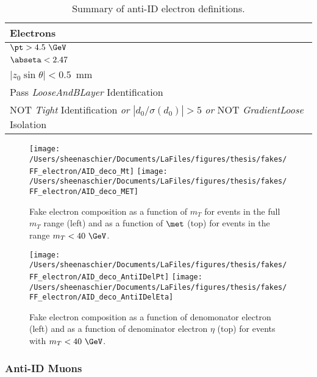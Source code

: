 \begin{table}[!htb]
\begin{center}
\begin{tabular}{l}
\hline
Electrons    \\
\hline
$\pt > 4.5~\GeV$   \\
$\abseta < 2.47$  \\
$|z_0\sin\theta| < 0.5$~mm  \\
Pass \textit{LooseAndBLayer} Identification \\
\hline
NOT \textit{Tight} Identification \textit{or} $|d_0/\sigma(d_0)| > 5$    \textit{or} NOT \textit{GradientLoose} Isolation  \\
\hline
\end{tabular}

\caption{Summary of anti-ID electron definitions.}
\label{tab:antiIDElDefs}
\end{center}
\end{table}


\begin{figure}[htb]
        \centering
        \texttt{[image: /Users/sheenaschier/Documents/LaFiles/figures/thesis/fakes/FF\_electron/AID\_deco\_Mt]}
        \texttt{[image: /Users/sheenaschier/Documents/LaFiles/figures/thesis/fakes/FF\_electron/AID\_deco\_MET]}
        \caption{Fake electron composition as a function of $m_{T}$ for events in the full $m_{T}$ range (left) and as a function of $\met$ (top) for events in the range $m_{T}<40~\GeV$. }
        \label{fig:elDeco_1}
\end{figure}


\begin{figure}[htb]
        \centering
        \texttt{[image: /Users/sheenaschier/Documents/LaFiles/figures/thesis/fakes/FF\_electron/AID\_deco\_AntiIDelPt]}
        \texttt{[image: /Users/sheenaschier/Documents/LaFiles/figures/thesis/fakes/FF\_electron/AID\_deco\_AntiIDelEta]}
        \caption{Fake electron composition as a function of denomonator electron \pt{} (left) and as a function of denominator electron $\eta$ (top) for events with $m_{T} < 40~\GeV$. }
        \label{fig:elDeco_2}
\end{figure}
  \FloatBarrier
  
\subsubsection{Anti-ID Muons}

